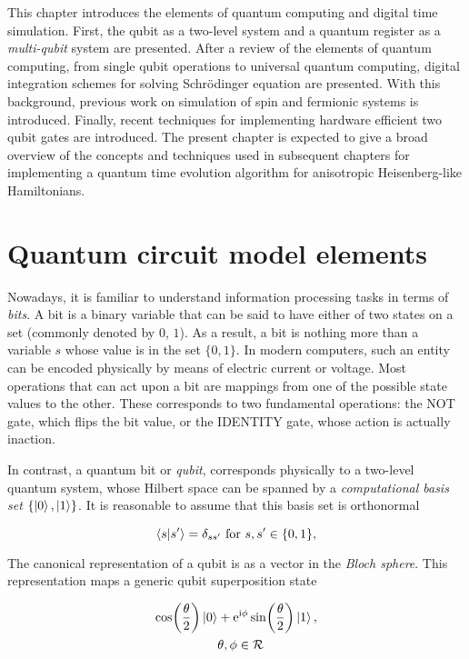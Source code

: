 This chapter introduces the elements of quantum computing and digital time simulation. First, the qubit as a two-level system and a quantum register as a \textit{multi-qubit} system are presented. After a review of the elements of quantum computing, from single qubit operations to universal quantum computing, digital integration schemes for solving Schrödinger equation are presented. With this background, previous work on simulation of spin and fermionic systems is introduced. Finally, recent techniques for implementing hardware efficient two qubit gates are introduced. The present chapter is expected to give a broad overview of the concepts and techniques used in subsequent chapters for implementing a quantum time evolution algorithm for anisotropic Heisenberg-like Hamiltonians.

\section{Quantum circuit model elements}
\label{sec:fundaQC}

  Nowadays, it is familiar to understand information processing tasks in terms of \textit{bits}. A bit is a binary variable that can be said to have either of two states on a set (commonly denoted by $0$, $1$). As a result, a bit is nothing more than a variable $s$ whose value is in the set $\{0,1\}$. In modern computers, such an entity can be encoded physically by means of electric current or voltage. Most operations that can act upon a bit are mappings from one of the possible state values to the other. These corresponds to two fundamental operations: the NOT gate, which flips the bit value, or the IDENTITY gate, whose action is actually inaction.

  In contrast, a quantum bit or \textit{qubit}, corresponds physically to a two-level quantum system, whose Hilbert space can be spanned by a \textit{computational basis set} $\{\ket{0}, \ket{1}\}$. It is reasonable to assume that this basis set is orthonormal

  \begin{equation}
    \braket{s}{s'} = \delta_{ss'} \text{ for } s, s' \in \{0,1\},
    \label{eq:comp-basis}
  \end{equation}

  The canonical representation of a qubit is as a vector in the \textit{Bloch sphere}. This representation maps a generic qubit superposition state

  \begin{align}
    \cos(\frac{\theta}{2}) \ket{0} &  + \mathrm{e}^{\mathrm{i}\phi}\sin(\frac{\theta}{2})\ket{1}, \\
    & \theta, \phi \in \mathcal{R}
    \label{eq:qubit-state}
  \end{align}

